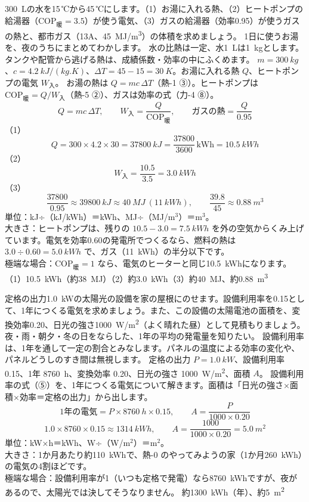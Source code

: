 \begin{phreidai}\label{ph:熱-16:ex2}
\qty{300}{L}の水を15\,℃から45\,℃にします。（1）お湯に入れる熱、（2）ヒートポンプの給湯器（$\mathrm{COP}_{\text{暖}}=3.5$）が使う電気、（3）ガスの給湯器（効率0.95）が使うガスの熱と、都市ガス（13A、\qty{45}{MJ/m^3}）の体積を求めましょう。
\phbamen
1日に使うお湯を、夜のうちにまとめてわかします。
\phmushi
水の比熱は一定、水\qty{1}{L}は\qty{1}{kg}とします。タンクや配管から逃げる熱は、成績係数・効率の中にふくめます。
\phzu
$m=\qty{300}{kg}$、$c=\qty{4.2}{kJ/(kg.K)}$、$\Delta T=45-15=\qty{30}{K}$。お湯に入れる熱 $Q$、ヒートポンプの電気 $W_{\text{入}}$。
\phriyu
お湯の熱は $Q=mc\,\Delta T$（熱-1 ③）。ヒートポンプは $\mathrm{COP}_{\text{暖}}=Q/W_{\text{入}}$（熱-5 ②）、ガスは効率の式（力-4 ⑧）。
\phtateru
\[Q=mc\,\Delta T,\qquad W_{\text{入}}=\frac{Q}{\mathrm{COP}_{\text{暖}}},\qquad \text{ガスの熱}=\frac{Q}{0.95}\]
\phtoku
（1）\[Q=300\times4.2\times30=\qty{37800}{kJ}=\frac{37800}{3600}\,\text{kWh}=\qty{10.5}{kWh}\]
（2）\[W_{\text{入}}=\frac{10.5}{3.5}=\qty{3.0}{kWh}\]
（3）\[\frac{37800}{0.95}\approx\qty{39800}{kJ}\approx\qty{40}{MJ}\ (\qty{11}{kWh}),\qquad \frac{39.8}{45}\approx\qty{0.88}{m^3}\]
\phtashikame
単位：kJ÷（kJ/kWh）＝kWh、MJ÷（MJ/m$^3$）＝m$^3$。\\
大きさ：ヒートポンプは、残りの $10.5-3.0=\qty{7.5}{kWh}$ を外の空気からくみ上げています。電気を効率0.60の発電所でつくるなら、燃料の熱は $3.0\div0.60=\qty{5.0}{kWh}$ で、ガス（\qty{11}{kWh}）の半分以下です。\\
極端な場合：$\mathrm{COP}_{\text{暖}}=1$ なら、電気のヒーターと同じ\qty{10.5}{kWh}になります。
\kotae （1）\qty{10.5}{kWh}（約\qty{38}{MJ}）（2）約\qty{3.0}{kWh}（3）約\qty{40}{MJ}、約\qty{0.88}{m^3}
\end{phreidai}

\begin{phreidai}\label{ph:熱-16:ex3}
定格の出力\qty{1.0}{kW}の太陽光の設備を家の屋根にのせます。設備利用率を0.15として、1年につくる電気を求めましょう。また、この設備の太陽電池の面積を、変換効率0.20、日光の強さ\qty{1000}{W/m^2}（よく晴れた昼）として見積もりましょう。
\phbamen
夜・雨・朝夕・冬の日をならした、1年の平均の発電量を知りたい。
\phmushi
設備利用率は、1年を通して一定の割合とみなします。パネルの温度による効率の変化や、パネルどうしのすき間は無視します。
\phzu
定格の出力 $P=\qty{1.0}{kW}$、設備利用率 0.15、1年 \qty{8760}{h}、変換効率 0.20、日光の強さ \qty{1000}{W/m^2}、面積 $A$。
\phriyu
設備利用率の式（⑤）を、1年につくる電気について解きます。面積は「日光の強さ×面積×効率＝定格の出力」から出します。
\phtateru
\[\text{1年の電気}=P\times\qty{8760}{h}\times0.15,\qquad A=\frac{P}{1000\times0.20}\]
\phtoku
\[1.0\times8760\times0.15\approx\qty{1314}{kWh},\qquad A=\frac{1000}{1000\times0.20}=\qty{5.0}{m^2}\]
\phtashikame
単位：kW×h＝kWh、W÷（W/m$^2$）＝m$^2$。\\
大きさ：1か月あたり約\qty{110}{kWh}で、熱-0 のやってみようの家（1か月\qty{260}{kWh}）の電気の4割ほどです。\\
極端な場合：設備利用率が1（いつも定格で発電）なら\qty{8760}{kWh}ですが、夜があるので、太陽光では決してそうなりません。
\kotae 約\qty{1300}{kWh}（年）、約\qty{5}{m^2}
\end{phreidai}

